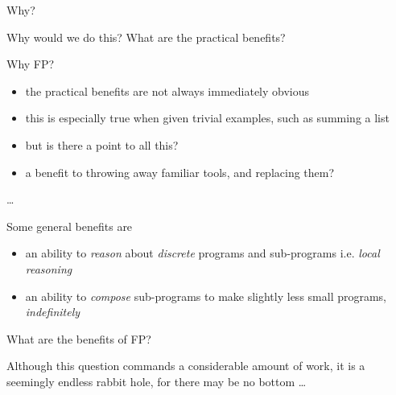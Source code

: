 \begin{frame}
\begin{block}{Why?}
\begin{center}
Why would we do this? What are the practical benefits?
\end{center}
\end{block}
\end{frame}

\begin{frame}
\begin{block}{Why FP?}
\begin{center}
\begin{itemize}
\item<1-> the practical benefits are not always immediately obvious
\item<2-> this is especially true when given trivial examples, such as summing a list
\item<3-> but is there a point to all this?
\item<4-> a benefit to throwing away familiar tools, and replacing them?
\end{itemize}
\end{center}
\end{block}
\end{frame}

\begin{frame}
\begin{center}
\ldots
\end{center}
\end{frame}

\begin{frame}
\begin{block}{Some general benefits are}
\begin{center}
\begin{itemize}
\item<1-> an ability to \emph{reason} about \emph{discrete} programs and sub-programs i.e. \emph{local reasoning}
\item<2-> an ability to \emph{compose} sub-programs to make slightly less small programs, \emph{indefinitely}
\end{itemize}
\end{center}
\end{block}
\end{frame}

\begin{frame}
\begin{block}{What are the benefits of FP?}
\begin{center}
Although this question commands a considerable amount of work, it is a seemingly endless rabbit hole, for there may be no bottom \ldots
\end{center}
\end{block}
\end{frame}
